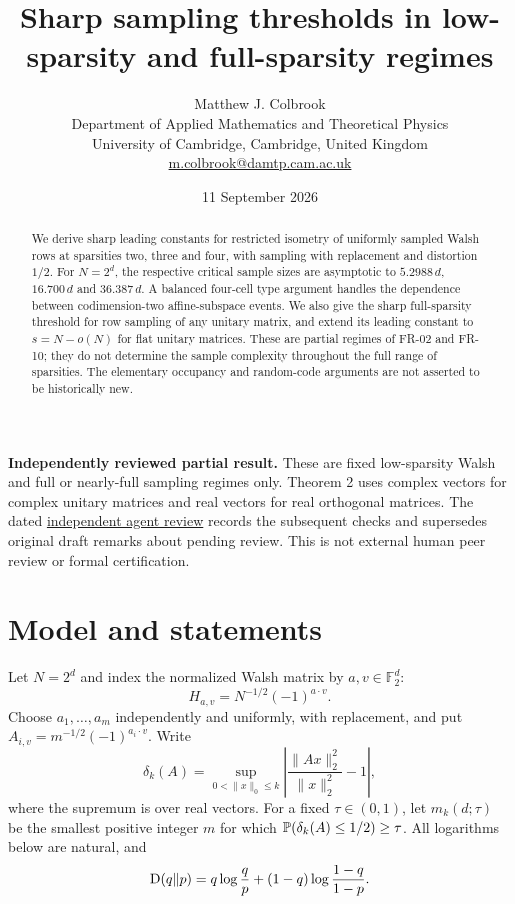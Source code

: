 \documentclass[11pt]{article}
\title{Sharp sampling thresholds in low-sparsity and full-sparsity regimes}
\author{Matthew J. Colbrook\\\small Department of Applied Mathematics and Theoretical Physics\\\small University of Cambridge, Cambridge, United Kingdom\\\small\href{mailto:m.colbrook@damtp.cam.ac.uk}{m.colbrook@damtp.cam.ac.uk}}\date{11 September 2026}
\theoremstyle{remark}\newtheorem{remark}[theorem]{Remark}
\newcommand{\F}{\mathbb F}\newcommand{\R}{\mathbb R}\newcommand{\C}{\mathbb C}
\begin{document}
\maketitle

\noindent\textbf{Independently reviewed partial result.} These are fixed low-sparsity Walsh and full or nearly-full sampling regimes only. Theorem 2 uses complex vectors for complex unitary matrices and real vectors for real orthogonal matrices.
The dated \href{https://github.com/MColbrook/OpenProblemsInNLA/blob/codex/colbrook-frames-submissions/references/colbrook-frames-2026-09-11/verification/reviews/sampling-review.md}{independent agent review} records the subsequent checks and supersedes original draft remarks about pending review. This is not external human peer review or formal certification.
\par\medskip

\begin{abstract}
We derive sharp leading constants for restricted isometry of uniformly sampled Walsh rows at sparsities two, three and four, with sampling with replacement and distortion $1/2$. For $N=2^d$, the respective critical sample sizes are asymptotic to $5.2988\,d$, $16.700\,d$ and $36.387\,d$. A balanced four-cell type argument handles the dependence between codimension-two affine-subspace events. We also give the sharp full-sparsity threshold for row sampling of any unitary matrix, and extend its leading constant to $s=N-o(N)$ for flat unitary matrices. These are partial regimes of FR-02 and FR-10; they do not determine the sample complexity throughout the full range of sparsities. The elementary occupancy and random-code arguments are not asserted to be historically new.
\end{abstract}

\section{Model and statements}
Let $N=2^d$ and index the normalized Walsh matrix by $a,v\in\F_2^d$:
\[
 H_{a,v}=N^{-1/2}(-1)^{a\cdot v}.
\]
Choose $a_1,\ldots,a_m$ independently and uniformly, with replacement, and put
$A_{i,v}=m^{-1/2}(-1)^{a_i\cdot v}$. Write
\[
 \delta_k(A)=\sup_{0<\|x\|_0\le k}
 \left|\frac{\|Ax\|_2^2}{\|x\|_2^2}-1\right|,
\]
where the supremum is over real vectors. For a fixed $\tau\in(0,1)$, let $m_k(d;\tau)$ be the smallest positive integer $m$ for which
$\mathbb P(\delta_k(A)\le1/2)\ge\tau$. All logarithms below are natural, and
\[
 \operatorname{D}(q\Vert p)=q\log\frac qp+(1-q)\log\frac{1-q}{1-p}.
\]
\end{document}
